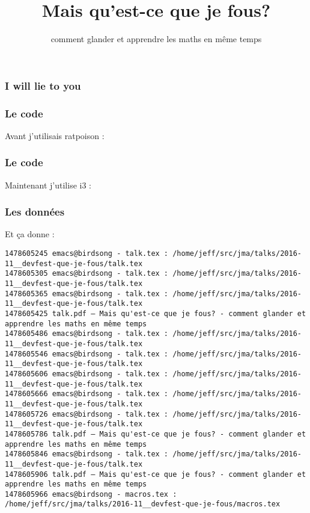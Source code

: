 
\usepackage{centernot}
\usepackage[]{algorithm2e}

\title
{Mais qu'est-ce que je fous?}
\subtitle{comment glander et apprendre les maths en même temps}


\huge

\begin{frame}
  \titlepage
\end{frame}


\begin{frame}
  \frametitle{I will lie to you}
\end{frame}

\begin{frame}
\end{frame}

\begin{frame}
  \frametitle{Le code}
  Avant j'utilisais ratpoison :
  \vspace{1cm}
  
\end{frame}

\begin{frame}
  \frametitle{Le code}
  Maintenant j'utilise i3 :
  \vspace{1cm}
  
\end{frame}

\begin{frame}[fragile]
  \frametitle{Les données}
  Et ça donne :
  \vspace{1cm}
  \begin{Verbatim}[fontsize=\tiny]
1478605245 emacs@birdsong - talk.tex : /home/jeff/src/jma/talks/2016-11__devfest-que-je-fous/talk.tex
1478605305 emacs@birdsong - talk.tex : /home/jeff/src/jma/talks/2016-11__devfest-que-je-fous/talk.tex
1478605365 emacs@birdsong - talk.tex : /home/jeff/src/jma/talks/2016-11__devfest-que-je-fous/talk.tex
1478605425 talk.pdf — Mais qu'est-ce que je fous? - comment glander et apprendre les maths en même temps
1478605486 emacs@birdsong - talk.tex : /home/jeff/src/jma/talks/2016-11__devfest-que-je-fous/talk.tex
1478605546 emacs@birdsong - talk.tex : /home/jeff/src/jma/talks/2016-11__devfest-que-je-fous/talk.tex
1478605606 emacs@birdsong - talk.tex : /home/jeff/src/jma/talks/2016-11__devfest-que-je-fous/talk.tex
1478605666 emacs@birdsong - talk.tex : /home/jeff/src/jma/talks/2016-11__devfest-que-je-fous/talk.tex
1478605726 emacs@birdsong - talk.tex : /home/jeff/src/jma/talks/2016-11__devfest-que-je-fous/talk.tex
1478605786 talk.pdf — Mais qu'est-ce que je fous? - comment glander et apprendre les maths en même temps
1478605846 emacs@birdsong - talk.tex : /home/jeff/src/jma/talks/2016-11__devfest-que-je-fous/talk.tex
1478605906 talk.pdf — Mais qu'est-ce que je fous? - comment glander et apprendre les maths en même temps
1478605966 emacs@birdsong - macros.tex : /home/jeff/src/jma/talks/2016-11__devfest-que-je-fous/macros.tex
  \end{Verbatim}
\end{frame}

